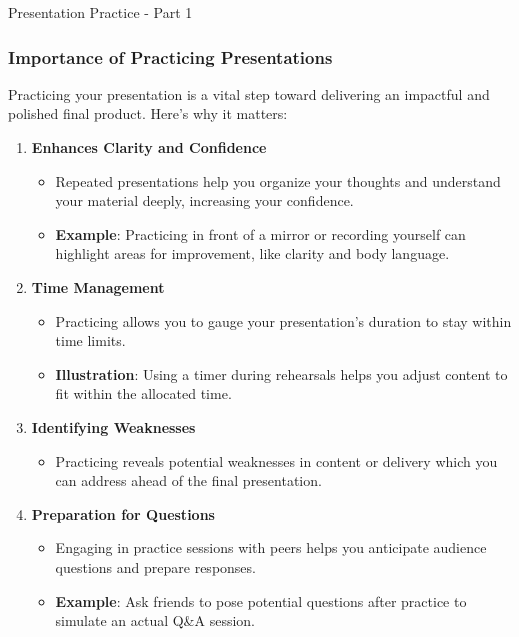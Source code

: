 \documentclass[aspectratio=169]{beamer}
\begin{document}
\begin{frame}[fragile]{Presentation Practice - Part 1}
    \frametitle{Importance of Practicing Presentations}
    Practicing your presentation is a vital step toward delivering an impactful and polished final product. Here’s why it matters:
    
    \begin{enumerate}
        \item \textbf{Enhances Clarity and Confidence}
        \begin{itemize}
            \item Repeated presentations help you organize your thoughts and understand your material deeply, increasing your confidence.
            \item \textbf{Example}: Practicing in front of a mirror or recording yourself can highlight areas for improvement, like clarity and body language.
        \end{itemize}

        \item \textbf{Time Management}
        \begin{itemize}
            \item Practicing allows you to gauge your presentation's duration to stay within time limits.
            \item \textbf{Illustration}: Using a timer during rehearsals helps you adjust content to fit within the allocated time.
        \end{itemize}

        \item \textbf{Identifying Weaknesses}
        \begin{itemize}
            \item Practicing reveals potential weaknesses in content or delivery which you can address ahead of the final presentation.
        \end{itemize}

        \item \textbf{Preparation for Questions}
        \begin{itemize}
            \item Engaging in practice sessions with peers helps you anticipate audience questions and prepare responses.
            \item \textbf{Example}: Ask friends to pose potential questions after practice to simulate an actual Q\&A session.
        \end{itemize}
    \end{enumerate}
\end{frame}
\end{document}
